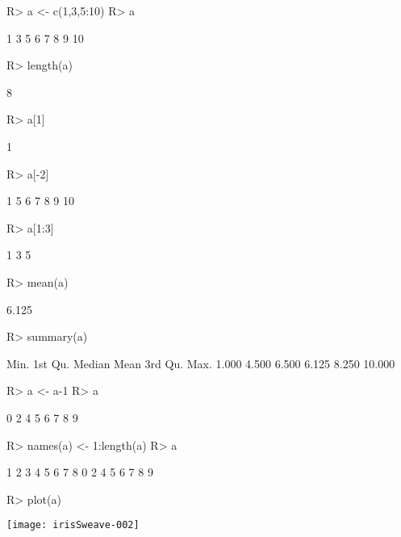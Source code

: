 \documentclass[fleqn, letter, 10pt]{article}
\begin{document}
\begin{Schunk}
\begin{Sinput}
R> a <- c(1,3,5:10)
R> a
\end{Sinput}
\begin{Soutput}
[1]  1  3  5  6  7  8  9 10
\end{Soutput}
\begin{Sinput}
R> length(a)
\end{Sinput}
\begin{Soutput}
[1] 8
\end{Soutput}
\begin{Sinput}
R> a[1]
\end{Sinput}
\begin{Soutput}
[1] 1
\end{Soutput}
\begin{Sinput}
R> a[-2]
\end{Sinput}
\begin{Soutput}
[1]  1  5  6  7  8  9 10
\end{Soutput}
\begin{Sinput}
R> a[1:3]
\end{Sinput}
\begin{Soutput}
[1] 1 3 5
\end{Soutput}
\begin{Sinput}
R> mean(a)
\end{Sinput}
\begin{Soutput}
[1] 6.125
\end{Soutput}
\begin{Sinput}
R> summary(a)
\end{Sinput}
\begin{Soutput}
   Min. 1st Qu.  Median    Mean 3rd Qu.    Max. 
  1.000   4.500   6.500   6.125   8.250  10.000 
\end{Soutput}
\begin{Sinput}
R> a <- a-1
R> a
\end{Sinput}
\begin{Soutput}
[1] 0 2 4 5 6 7 8 9
\end{Soutput}
\begin{Sinput}
R> names(a) <- 1:length(a)
R> a
\end{Sinput}
\begin{Soutput}
1 2 3 4 5 6 7 8 
0 2 4 5 6 7 8 9 
\end{Soutput}
\begin{Sinput}
R> plot(a)
\end{Sinput}
\end{Schunk}
\texttt{[image: irisSweave-002]}
\end{document}
